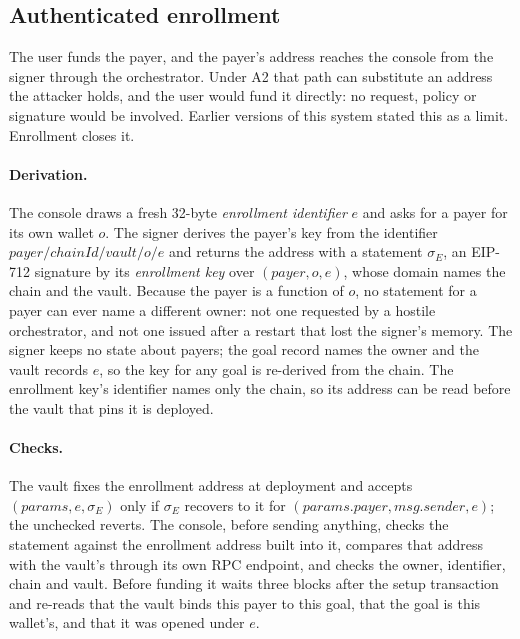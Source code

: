 \subsection{Authenticated enrollment}
\label{sec:enrollment}

The user funds the payer, and the payer's address reaches the console from the signer through the
orchestrator. Under A2 that path can substitute an address the attacker holds, and the user would fund it
directly: no request, policy or signature would be involved. Earlier versions of this system stated this as
a limit. Enrollment closes it.

\paragraph{Derivation.} The console draws a fresh 32-byte \emph{enrollment identifier} $e$ and asks for a
payer for its own wallet $o$. The signer derives the payer's key from the identifier
$\mathit{payer}/\mathit{chainId}/\mathit{vault}/o/e$ and returns the address with a statement
$\sigma_E$, an EIP-712 signature by its \emph{enrollment key} over $(\mathit{payer}, o, e)$, whose domain names
the chain and the vault. Because the payer is a function of $o$, no statement for a payer can ever name a
different owner: not one requested by a hostile orchestrator, and not one issued after a restart that lost the
signer's memory. The signer keeps no state about payers; the goal record names the owner and the vault records
$e$, so the key for any goal is re-derived from the chain. The enrollment key's identifier names only the
chain, so its address can be read before the vault that pins it is deployed.

\paragraph{Checks.} The vault fixes the enrollment address at deployment and accepts
$(\mathit{params}, e, \sigma_E)$ only if $\sigma_E$ recovers to it for
$(\mathit{params.payer}, \mathit{msg.sender}, e)$; the unchecked  reverts. The console, before
sending anything, checks the statement against the enrollment address built into it, compares that address
with the vault's  through its own RPC endpoint, and checks the owner, identifier, chain
and vault. Before funding it waits three blocks after the setup transaction and re-reads that the vault binds
this payer to this goal, that the goal is this wallet's, and that it was opened under $e$.

